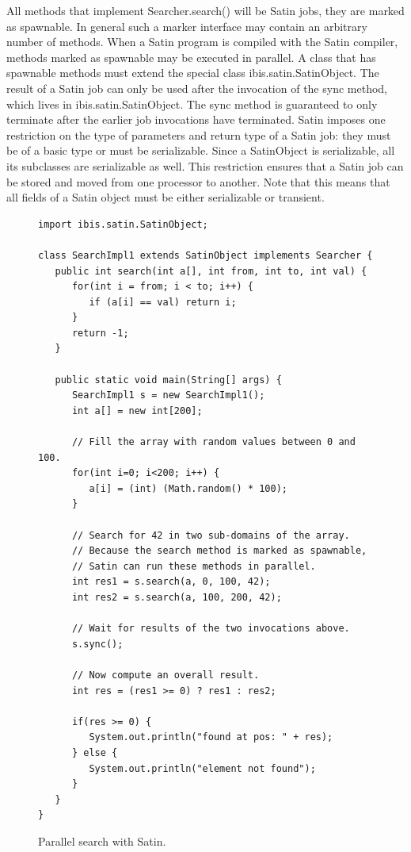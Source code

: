 \documentclass[10pt]{article}
\begin{document}
All methods that implement Searcher.search() will be Satin jobs, they
are marked as spawnable.  In general such a marker interface may
contain an arbitrary number of methods.  When a Satin program is
compiled with the Satin compiler, methods marked as spawnable may be
executed in parallel. A class that has spawnable methods 
must extend the special class ibis.satin.SatinObject.
The result of a Satin job can only be
used after the invocation of the sync method, which lives in
ibis.satin.SatinObject. The sync method is guaranteed to only
terminate after the earlier job invocations have terminated.  Satin
imposes one restriction on the type of parameters and return type of a
Satin job: they must be of a basic type or must be serializable.
Since a SatinObject is serializable, all its subclasses are
serializable as well. This restriction ensures that a Satin job can be
stored and moved from one processor to another. Note that this means that
all fields of a Satin object must be either serializable or transient.

\begin{figure}[t!]
{\small
\begin{verbatim}
import ibis.satin.SatinObject;

class SearchImpl1 extends SatinObject implements Searcher {
   public int search(int a[], int from, int to, int val) {
      for(int i = from; i < to; i++) {
         if (a[i] == val) return i;
      }
      return -1;
   }

   public static void main(String[] args) {
      SearchImpl1 s = new SearchImpl1();
      int a[] = new int[200];

      // Fill the array with random values between 0 and 100.
      for(int i=0; i<200; i++) {
         a[i] = (int) (Math.random() * 100);
      }

      // Search for 42 in two sub-domains of the array.
      // Because the search method is marked as spawnable,
      // Satin can run these methods in parallel.
      int res1 = s.search(a, 0, 100, 42);
      int res2 = s.search(a, 100, 200, 42);

      // Wait for results of the two invocations above.
      s.sync();

      // Now compute an overall result.
      int res = (res1 >= 0) ? res1 : res2;

      if(res >= 0) {
         System.out.println("found at pos: " + res);
      } else {
         System.out.println("element not found");
      }
   }
}
\end{verbatim}
}
\caption{Parallel search with Satin.}
\label{satin-search-fig}
\end{figure}
\end{document}
